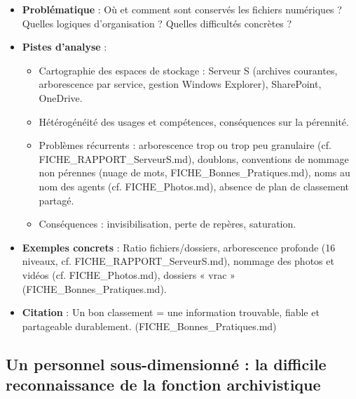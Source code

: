 \begin{itemize}
	\item \textbf{Problématique} : Où et comment sont conservés les fichiers numériques ? Quelles logiques d’organisation ? Quelles difficultés concrètes ?
	\item \textbf{Pistes d’analyse} :
	\begin{itemize}
		\item Cartographie des espaces de stockage : Serveur S (archives courantes, arborescence par service, gestion Windows Explorer), SharePoint, OneDrive.
		\item Hétérogénéité des usages et compétences, conséquences sur la pérennité.
		\item Problèmes récurrents : arborescence trop ou trop peu granulaire (cf. FICHE\_RAPPORT\_ServeurS.md), doublons, conventions de nommage non pérennes (nuage de mots, FICHE\_Bonnes\_Pratiques.md), noms au nom des agents (cf. FICHE\_Photos.md), absence de plan de classement partagé.
		\item Conséquences : invisibilisation, perte de repères, saturation.
	\end{itemize}
	\item \textbf{Exemples concrets} : Ratio fichiers/dossiers, arborescence profonde (16 niveaux, cf. FICHE\_RAPPORT\_ServeurS.md), nommage des photos et vidéos (cf. FICHE\_Photos.md), dossiers « vrac » (FICHE\_Bonnes\_Pratiques.md).
	\item \textbf{Citation} : \og Un bon classement = une information trouvable, fiable et partageable durablement. \fg (FICHE\_Bonnes\_Pratiques.md)
\end{itemize}

\subsection{Un personnel sous-dimensionné : la difficile reconnaissance de la fonction archivistique}

